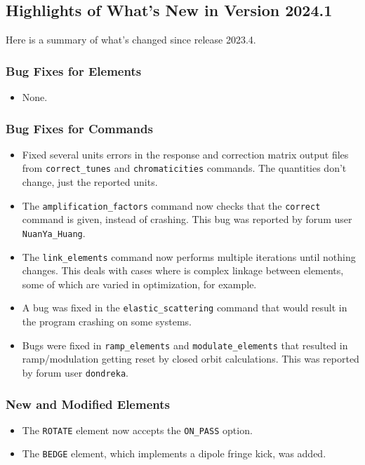 \documentclass[11pt]{article}
\begin{document}
\subsection{Highlights of What's New in Version 2024.1}

Here is a summary of what's changed since release 2023.4.

\subsubsection{Bug Fixes for Elements}

\begin{itemize}
\item None.
\end{itemize}

\subsubsection{Bug Fixes for Commands}
\begin{itemize}
\item Fixed several units errors in the response and correction matrix output files from \verb|correct_tunes| and
  \verb|chromaticities| commands. The quantities don't change, just the reported units.
\item The \verb|amplification_factors| command now checks that the \verb|correct| command is given, instead of
  crashing. This bug was reported by forum user \verb|NuanYa_Huang|.
\item The \verb|link_elements| command now performs multiple iterations until nothing changes. This deals with
  cases where is complex linkage between elements, some of which are varied in optimization, for example.
\item A bug was fixed in the \verb|elastic_scattering| command that would result in the program crashing on
  some systems.
\item Bugs were fixed in \verb|ramp_elements| and \verb|modulate_elements| that resulted in
  ramp/modulation getting reset by closed orbit calculations. This was reported by forum user \verb|dondreka|.
\end{itemize}

\subsubsection{New and Modified Elements}
\begin{itemize}
\item The \verb|ROTATE| element now accepts the \verb|ON_PASS| option.
\item The \verb|BEDGE| element, which implements a dipole fringe kick, was added.
\end{itemize}
\end{document}
